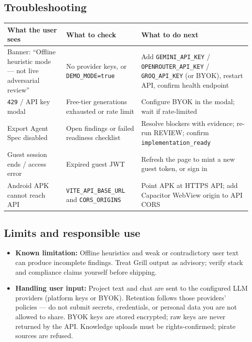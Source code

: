 \documentclass[11pt,a4paper]{article}
\begin{document}
\subsection{Troubleshooting}
{\small
\begin{tabularx}{\textwidth}{@{}Y Y Y@{}}
\toprule
\textbf{What the user sees} & \textbf{What to check} & \textbf{What to do next} \\
\midrule
Banner: ``Offline heuristic mode --- not live adversarial review''
  & No provider keys, or \texttt{DEMO\_MODE=true}
  & Add \texttt{GEMINI\_API\_KEY} / \texttt{OPENROUTER\_API\_KEY} / \texttt{GROQ\_API\_KEY} (or BYOK), restart API, confirm health endpoint \\
\addlinespace
\texttt{429} / API key modal
  & Free-tier generations exhausted or rate limit
  & Configure BYOK in the modal; wait if rate-limited \\
\addlinespace
Export Agent Spec disabled
  & Open findings or failed readiness checklist
  & Resolve blockers with evidence; re-run REVIEW; confirm \texttt{implementation\_ready} \\
\addlinespace
Guest session ends / access error
  & Expired guest JWT
  & Refresh the page to mint a new guest token, or sign in \\
\addlinespace
Android APK cannot reach API
  & \texttt{VITE\_API\_BASE\_URL} and \texttt{CORS\_ORIGINS}
  & Point APK at HTTPS API; add Capacitor WebView origin to API CORS \\
\bottomrule
\end{tabularx}
}

\subsection{Limits and responsible use}
\begin{itemize}
  \item \textbf{Known limitation:} Offline heuristics and weak or contradictory user text can
        produce incomplete findings. Treat Grill output as advisory; verify stack and compliance
        claims yourself before shipping.
  \item \textbf{Handling user input:} Project text and chat are sent to the configured LLM providers
        (platform keys or BYOK). Retention follows those providers' policies --- do not submit
        secrets, credentials, or personal data you are not allowed to share. BYOK keys are stored
        encrypted; raw keys are never returned by the API. Knowledge uploads must be rights-confirmed;
        pirate sources are refused.
\end{itemize}
\end{document}
